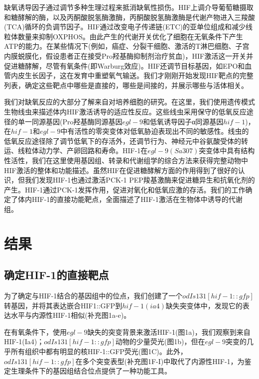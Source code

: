 \documentclass{ctexart}
\begin{document}
        缺氧诱导因子通过调节多种生理过程来抵消缺氧性损伤。HIF上调介导葡萄糖摄取和糖酵解的酶，以及丙酮酸脱氢酶激酶，丙酮酸脱氢酶激酶是代谢产物进入三羧酸(TCA)循环的负调节因子。HIF通过改变电子传递链(ETC)的亚单位组成和减少线粒体数量来抑制OXPHOS。由此产生的代谢开关优化了细胞在无氧条件下产生ATP的能力。在某些情况下(例如，癌症、分裂干细胞、激活的T淋巴细胞、子宫内膜蜕膜化，假设患者正在接受Pro羟基酶抑制剂治疗贫血)，HIF激活这一开关并促进糖酵解，尽管有氧条件(即Warburg效应)。HIF还调节目标基因，如EPO和血管内皮生长因子，这在发育中重塑氧气输送。我们才刚刚开始发现HIF靶点的完整列表，确定这些靶点中哪些是直接的，哪些是间接的，并展示哪些与活体相关。

        我们对缺氧反应的大部分了解来自对培养细胞的研究。在这里，我们使用遗传模式生物线虫来描述体内HIF激活诱导的适应性反应。这些线虫采用保守的低氧反应途径的单一同源基因(Pro羟基酶同源基因$egl-9$和低氧诱导因子α同源基因$hif-1$)，在$hif-1$和$egl-9$中有活性的零突变体对低氧胁迫表现出不同的敏感性。线虫的低氧反应途径除了调节低氧下的存活外，还调节行为、神经元中谷氨酸受体的转运、线粒体动力学、产卵回路和寿命。HIF-1在$egl-9(Sa307)$突变体中具有结构性活性，我们在这里使用基因组、转录和代谢组学的综合方法来获得完整动物中HIF激活的整体和功能描述。虽然HIF在促进糖酵解方面的作用得到了很好的认识，但我们发现HIF-1也通过激活PCK-1 PEP羧基激酶来促进糖异生和抗氧化剂的产生。HIF-1通过PCK-1发挥作用，促进对氧化和低氧应激的存活。我们的工作确定了体内HIF-1的直接功能靶点，全面描述了HIF-1激活在生物体中诱导的代谢组。


    

    \section{结果}
    \subsection{确定HIF-1的直接靶点}

        为了确定与HIF-1结合的基因组中的位点，我们创建了一个$odIs131[hif-1::gfp]$转基因，并将其表达嵌合HIF1::GFP到$hif-1(ia4)$缺失突变体中，发现它的表达水平与内源性HIF-1相似(补充图1a-e)。

        在有氧条件下，使用$egl-9$缺失的突变背景来激活HIF-1(图1a)，我们观察到来自HIF-1(Ia4)；$odIs131[hif-1::gfp]$动物的少量荧光(图1b)，但在$egl-9$突变的几乎所有组织中都有明显的核HIF-1::GFP荧光(图1C)。此外，$odIs131[hif-1::gfp]$在多个突变表型(补充图1F-I)中取代了内源性HIF-1，为鉴定生理条件下的基因组结合位点提供了一种功能工具。
        
\end{document}
